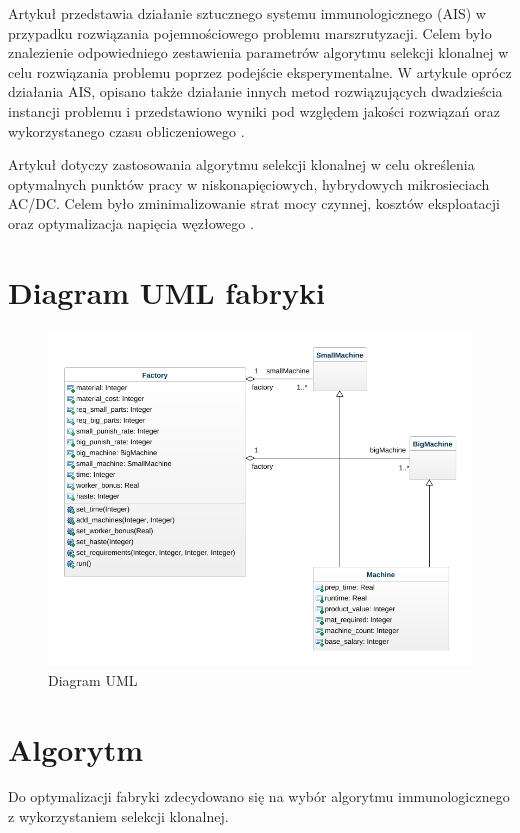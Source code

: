 \documentclass[a4paper]{article}
\begin{document}
Artykuł przedstawia działanie sztucznego systemu immunologicznego (AIS) w przypadku rozwiązania pojemnościowego problemu marszrutyzacji. Celem było znalezienie odpowiedniego zestawienia parametrów algorytmu selekcji klonalnej w celu rozwiązania problemu poprzez podejście eksperymentalne. W artykule oprócz działania AIS, opisano także działanie innych metod rozwiązujących dwadzieścia instancji problemu i przedstawiono wyniki pod względem jakości rozwiązań oraz wykorzystanego czasu obliczeniowego \cite{thapatsuwan}.


Artykuł dotyczy zastosowania algorytmu selekcji klonalnej w celu określenia optymalnych punktów pracy w niskonapięciowych, hybrydowych mikrosieciach AC/DC. Celem było zminimalizowanie strat mocy czynnej, kosztów eksploatacji oraz optymalizacja napięcia węzłowego \cite{rokicki}.


\section{Diagram UML fabryki}
\begin{figure}[ht]
\centering
\includegraphics[width=.7\textwidth]{UML_Model.png}
\caption{Diagram UML}
\end{figure}

\section{Algorytm}
Do optymalizacji fabryki zdecydowano się na wybór algorytmu immunologicznego z wykorzystaniem selekcji klonalnej.
\end{document}
